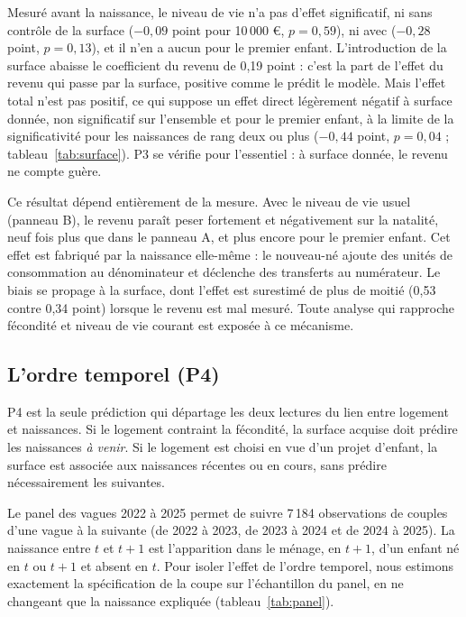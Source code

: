 \documentclass[11pt,a4paper]{article}
\theoremstyle{plain}
\theoremstyle{definition}
\theoremstyle{remark}
\begin{document}
Mesuré avant la naissance, le niveau de vie n'a pas d'effet significatif, ni sans contrôle de la surface ($-0{,}09$ point pour 10\,000 €, $p = 0{,}59$), ni avec ($-0{,}28$ point, $p = 0{,}13$), et il n'en a aucun pour le premier enfant. L'introduction de la surface abaisse le coefficient du revenu de 0,19 point : c'est la part de l'effet du revenu qui passe par la surface, positive comme le prédit le modèle. Mais l'effet total n'est pas positif, ce qui suppose un effet direct légèrement négatif à surface donnée, non significatif sur l'ensemble et pour le premier enfant, à la limite de la significativité pour les naissances de rang deux ou plus ($-0{,}44$ point, $p = 0{,}04$ ; tableau~\ref{tab:surface}). P3 se vérifie pour l'essentiel : à surface donnée, le revenu ne compte guère.

Ce résultat dépend entièrement de la mesure. Avec le niveau de vie usuel (panneau B), le revenu paraît peser fortement et négativement sur la natalité, neuf fois plus que dans le panneau A, et plus encore pour le premier enfant. Cet effet est fabriqué par la naissance elle-même : le nouveau-né ajoute des unités de consommation au dénominateur et déclenche des transferts au numérateur. Le biais se propage à la surface, dont l'effet est surestimé de plus de moitié (0,53 contre 0,34 point) lorsque le revenu est mal mesuré. Toute analyse qui rapproche fécondité et niveau de vie courant est exposée à ce mécanisme.

\subsection{L'ordre temporel (P4)}\label{sec:panel}

P4 est la seule prédiction qui départage les deux lectures du lien entre logement et naissances. Si le logement contraint la fécondité, la surface acquise doit prédire les naissances \emph{à venir}. Si le logement est choisi en vue d'un projet d'enfant, la surface est associée aux naissances récentes ou en cours, sans prédire nécessairement les suivantes.

Le panel des vagues 2022 à 2025 permet de suivre 7\,184 observations de couples d'une vague à la suivante (de 2022 à 2023, de 2023 à 2024 et de 2024 à 2025). La naissance entre $t$ et $t+1$ est l'apparition dans le ménage, en $t+1$, d'un enfant né en $t$ ou $t+1$ et absent en $t$. Pour isoler l'effet de l'ordre temporel, nous estimons exactement la spécification de la coupe sur l'échantillon du panel, en ne changeant que la naissance expliquée (tableau~\ref{tab:panel}).
\end{document}
